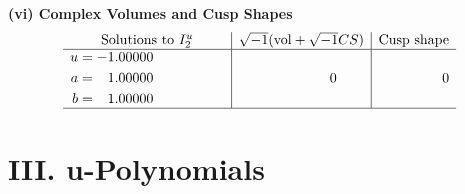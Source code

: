 \documentclass[1p]{elsarticle_modified}
\theoremstyle{definition}
\newcommand{\I}{\sqrt{-1}}
\begin{document}
\newpage\flushleft \textbf{(vi) Complex Volumes and Cusp Shapes}
$$\begin{array}{c|c|c}  
\text{Solutions to }I^u_{2}& \I (\text{vol} + \sqrt{-1}CS) & \text{Cusp shape}\\
 \hline 
\begin{aligned}
u &= -1.00000\phantom{ +0.000000I} \\
a &= \phantom{-}1.00000\phantom{ +0.000000I} \\
b &= \phantom{-}1.00000\phantom{ +0.000000I}\end{aligned}
 & \phantom{-0.000000 } 0 & \phantom{-0.000000 } 0\\
 \hline 
 \end{array}$$\newpage
\newpage\renewcommand{\arraystretch}{1}
\centering \section*{ III. u-Polynomials}
\end{document}
